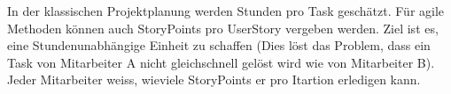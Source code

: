 In der klassischen Projektplanung werden Stunden pro Task geschätzt. Für agile Methoden können auch StoryPoints pro UserStory vergeben werden. Ziel ist es, eine Stundenunabhängige Einheit zu schaffen (Dies löst das Problem, dass ein Task von Mitarbeiter A nicht gleichschnell gelöst wird wie von Mitarbeiter B). Jeder Mitarbeiter weiss, wieviele StoryPoints er pro Itartion erledigen kann.